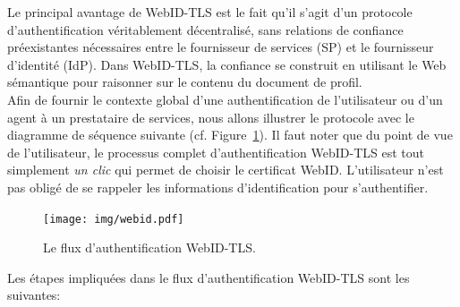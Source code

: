 Le principal avantage de WebID-TLS est le fait qu'il s'agit d'un protocole d'authentification véritablement décentralisé, sans relations de confiance préexistantes nécessaires entre le fournisseur de services (SP) et le fournisseur d'identité (IdP). Dans WebID-TLS, la confiance se construit en utilisant le Web sémantique pour raisonner sur le contenu du document de profil.\\


Afin de fournir le contexte global d'une authentification de l'utilisateur ou d'un agent à un prestataire de services, nous allons illustrer le protocole avec le diagramme de séquence suivante (cf. Figure~\ref{fig:webid-flow-fr}). Il faut noter que du point de vue de l'utilisateur, le processus complet d'authentification WebID-TLS est tout simplement \textit{un clic} qui permet de choisir le certificat WebID. L'utilisateur n'est pas obligé de se rappeler les informations d'identification pour s'authentifier.\\

\begin{figure}[h]
  \begin{center}
    \texttt{[image: img/webid.pdf]}
        \caption{Le flux d'authentification WebID-TLS.}
        \label{fig:webid-flow-fr}
  \end{center}
\end{figure}

Les étapes impliquées dans le flux d'authentification WebID-TLS sont les suivantes:

